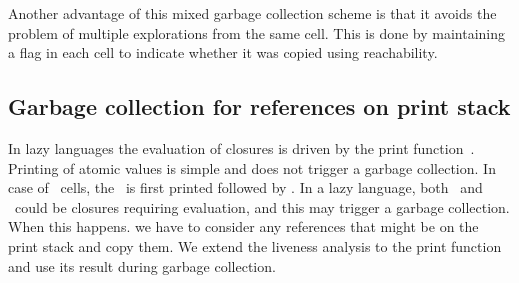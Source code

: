 \documentclass[9pt]{sigplanconf}
\newcommand{\cred}[1]{{\color{red}{#1}}}
\begin{document}
Another advantage of  this mixed garbage collection scheme  is that it
avoids the problem of multiple  explorations from the same cell.  This
is done by maintaining a flag in  each cell to indicate whether it was
copied using reachability.

\subsection{Garbage collection for references on print stack}
In lazy  languages the evaluation of  closures is driven  by the print
function~\cite{Jones87}.  Printing of  atomic values is
simple  and  does  not  trigger  a garbage  collection.   In  case  of
\CONS\ cells, the \CAR\ is first  printed followed by \CDR.  In a lazy
language, both \CAR\ and \CDR\ could be closures requiring evaluation,
and this  may trigger  a garbage collection.   When this  happens.  we
have to consider  any references that might be on  the print stack and
copy them. We extend the liveness analysis to the print function and
use its result during garbage collection.



\end{document}
